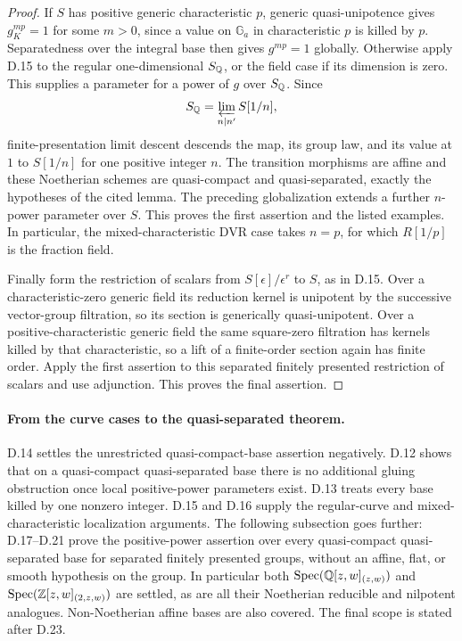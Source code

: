 \begin{proof}
If $S$ has positive generic characteristic $p$, generic
quasi-unipotence gives $g_K^{mp}=1$ for some $m>0$, since a
value on $\mathbb G_a$ in characteristic $p$ is killed by $p$.
Separatedness over the integral base then gives $g^{mp}=1$
globally. Otherwise apply D.15 to the regular one-dimensional
$S_{\mathbb Q}$, or the field case if its dimension is zero. This
supplies a parameter for a power of $g$ over $S_{\mathbb Q}$.
Since
\[
                   S_{\mathbb Q}=\varprojlim_{n\mid n'}S[1/n],
\]
finite-presentation limit descent descends the map, its group
law, and its value at $1$ to $S[1/n]$ for one positive integer
$n$. The transition morphisms are affine and these Noetherian
schemes are quasi-compact and quasi-separated, exactly the
hypotheses of the cited lemma. The preceding globalization
extends a further $n$-power parameter over $S$. This proves
the first assertion and the listed examples. In particular,
the mixed-characteristic DVR case takes $n=p$, for which
$R[1/p]$ is the fraction field.

Finally form the restriction of scalars from
$S[\epsilon]/\epsilon^r$ to $S$, as in D.15. Over a
characteristic-zero generic field its reduction kernel is
unipotent by the successive vector-group filtration, so its
section is generically quasi-unipotent. Over a positive-characteristic
generic field the same square-zero filtration has kernels
killed by that characteristic, so a lift of a finite-order
section again has finite order. Apply the first assertion
to this separated finitely presented restriction of scalars
and use adjunction. This proves the final assertion.
\end{proof}

\paragraph{From the curve cases to the quasi-separated theorem.}
D.14 settles the unrestricted quasi-compact-base assertion negatively.
D.12 shows that on a quasi-compact quasi-separated base there is no
additional gluing obstruction once local positive-power parameters
exist. D.13 treats every base killed by one nonzero integer.
D.15 and D.16 supply the regular-curve and mixed-characteristic
localization arguments. The following subsection goes further:
D.17--D.21 prove the positive-power assertion over every quasi-compact
quasi-separated base for separated finitely presented groups,
without an affine, flat, or smooth hypothesis on the group.
In particular both $\operatorname{Spec}(\mathbb Q[z,w]_{(z,w)})$ and
$\operatorname{Spec}(\mathbb Z[z,w]_{(2,z,w)})$ are settled, as are all
their Noetherian reducible and nilpotent analogues.
Non-Noetherian affine bases are also covered. The final scope
is stated after D.23.

